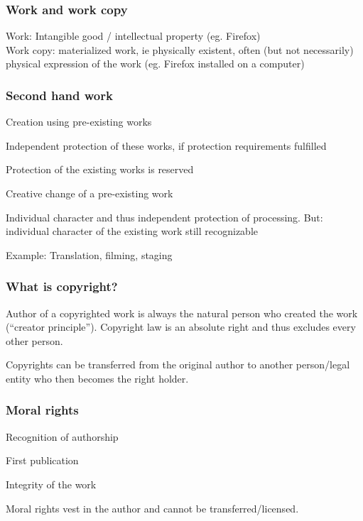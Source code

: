\subsubsection{Work and work copy}
Work: Intangible good / intellectual property (eg. Firefox)\\
Work copy: materialized work, ie physically existent, often (but not necessarily) physical expression of the work (eg. Firefox installed on a computer)

\subsubsection{Second hand work}
\begin{compactitem}
	\item Creation using pre-existing works
	\item Independent protection of these works, if protection requirements fulfilled
	\item Protection of the existing works is reserved
	\item Creative change of a pre-existing work
	\item Individual character and thus independent protection of processing. But: individual character of the existing work still recognizable
	\item Example: Translation, filming, staging
\end{compactitem}

\subsubsection{What is copyright?}
\begin{compactitem}
	\item Author of a copyrighted work is always the natural person who created the work (“creator principle”). Copyright law is an absolute right and thus excludes every other person.
	\item Copyrights can be transferred from the original author to another person/legal entity who then becomes the right holder.
\end{compactitem}

\subsubsection{Moral rights}
\begin{compactitem}
	\item Recognition of authorship
	\item First publication
	\item Integrity of the work
\end{compactitem}
Moral rights vest in the author and cannot be transferred/licensed.

